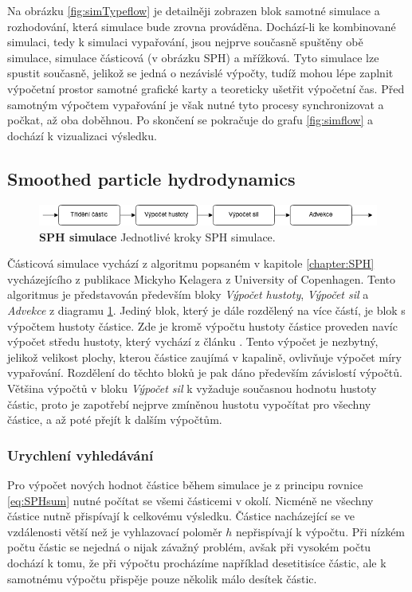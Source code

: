 Na obrázku \ref{fig:simTypeflow} je detailněji zobrazen blok samotné simulace a rozhodování, která simulace bude zrovna prováděna. Dochází-li ke kombinované simulaci, tedy k simulaci vypařování, jsou nejprve současně spuštěny obě simulace, simulace částicová (v obrázku SPH) a mřížková. Tyto simulace lze spustit současně, jelikož se jedná o nezávislé výpočty, tudíž mohou lépe zaplnit výpočetní prostor samotné grafické karty a teoreticky ušetřit výpočetní čas. Před samotným výpočtem vypařování je však nutné tyto procesy synchronizovat a počkat, až oba doběhnou. Po skončení se pokračuje do grafu \ref{fig:simflow} a dochází k vizualizaci výsledku.


\subsection{Smoothed particle hydrodynamics}
\label{chapter:simSPH}

\begin{figure}[hbt]
	\centering
	\captionsetup{justification=centering}
	\includegraphics[scale=0.6]{obrazky-figures/SPH.png}
	\caption{\textbf{SPH simulace} Jednotlivé kroky SPH simulace.}
	\label{fig:SPHflow}
\end{figure}

Částicová simulace vychází z algoritmu popsaném v kapitole \ref{chapter:SPH} vycházejícího z publikace \cite{KelagerSPH} Mickyho Kelagera z University of Copenhagen. Tento algoritmus je představován především bloky \textit{Výpočet hustoty}, \textit{Výpočet sil} a \textit{Advekce} z diagramu \ref{fig:SPHflow}. Jediný blok, který je dále rozdělený na více částí, je blok s výpočtem hustoty částice. Zde je kromě výpočtu hustoty částice proveden navíc výpočet středu hustoty, který vychází z článku \cite{sufaceSPH}. Tento výpočet je nezbytný, jelikož velikost plochy, kterou částice zaujímá v kapalině, ovlivňuje výpočet míry vypařování. Rozdělení do těchto bloků je pak dáno především závislostí výpočtů. Většina výpočtů v bloku \textit{Výpočet sil} k vyžaduje současnou hodnotu hustoty částic, proto je zapotřebí nejprve zmíněnou hustotu vypočítat pro všechny částice, a až poté přejít k dalším výpočtům.

\subsubsection{Urychlení vyhledávání}
Pro výpočet nových hodnot částice během simulace je z principu rovnice \ref{eq:SPHsum} nutné počítat se všemi částicemi v okolí. Nicméně ne všechny částice nutně přispívají k celkovému výsledku. Částice nacházející se ve vzdálenosti větší než je vyhlazovací poloměr $h$ nepřispívají k výpočtu. Při nízkém počtu částic se nejedná o nijak závažný problém, avšak při vysokém počtu dochází k tomu, že při výpočtu procházíme například desetitisíce částic, ale k samotnému výpočtu přispěje pouze několik málo desítek částic. 

